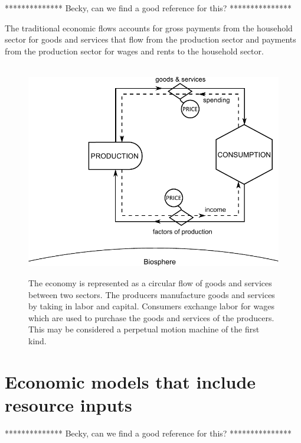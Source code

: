 ************** Becky, can we find a good reference for this? ***************

The traditional economic flows accounts for gross payments 
from the household sector for goods and services that flow 
from the production sector and payments 
from the production sector for wages and rents to the household sector.

\begin{figure}[!ht]
\centering\
\includegraphics[width=\linewidth]{Part_0/Chapter_Introduction/images/Perpetual_motion_1.pdf}
\caption[The traditional economic model of the economy]{The economy 
is represented as a circular flow of goods and services between two sectors. 
The producers manufacture goods and services 
by taking in labor and capital. 
Consumers exchange labor for wages 
which are used to purchase 
the goods and services of the producers. 
This may be considered a perpetual motion machine of the first kind.}
\label{fig:perp_motion_1}
\end{figure}

\section{Economic models that include resource inputs}

************** Becky, can we find a good reference for this? ***************

